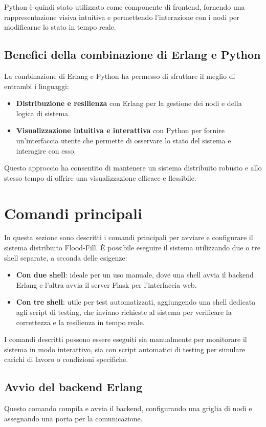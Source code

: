 \documentclass[12pt, a4paper]{report}
\begin{document}
Python \`e quindi stato utilizzato come componente di frontend, fornendo una rappresentazione visiva intuitiva e permettendo l'interazione con i nodi per modificarne lo stato in tempo reale.

\subsection{Benefici della combinazione di Erlang e Python}

La combinazione di Erlang e Python ha permesso di sfruttare il meglio di entrambi i linguaggi:
\begin{itemize}
    \item \textbf{Distribuzione e resilienza} con Erlang per la gestione dei nodi e della logica di sistema.
    \item \textbf{Visualizzazione intuitiva e interattiva} con Python per fornire un’interfaccia utente che permette di osservare lo stato del sistema e interagire con esso.
\end{itemize}

Questo approccio ha consentito di mantenere un sistema distribuito robusto e allo stesso tempo di offrire una visualizzazione efficace e flessibile.

\section{Comandi principali}

In questa sezione sono descritti i comandi principali per avviare e configurare il sistema distribuito Flood-Fill. \`E possibile eseguire il sistema utilizzando due o tre shell separate, a seconda delle esigenze:
\begin{itemize}
  \item \textbf{Con due shell}: ideale per un uso manuale, dove una shell avvia il backend Erlang e l’altra avvia il server Flask per l’interfaccia web.
  \item \textbf{Con tre shell}: utile per test automatizzati, aggiungendo una shell dedicata agli script di testing, che inviano richieste al sistema per verificare la correttezza e la resilienza in tempo reale.
\end{itemize}

I comandi descritti possono essere eseguiti sia manualmente per monitorare il sistema in modo interattivo, sia con script automatici di testing per simulare carichi di lavoro o condizioni specifiche.

\subsection{Avvio del backend Erlang}
Questo comando compila e avvia il backend, configurando una griglia di nodi e assegnando una porta per la comunicazione. 
\end{document}

